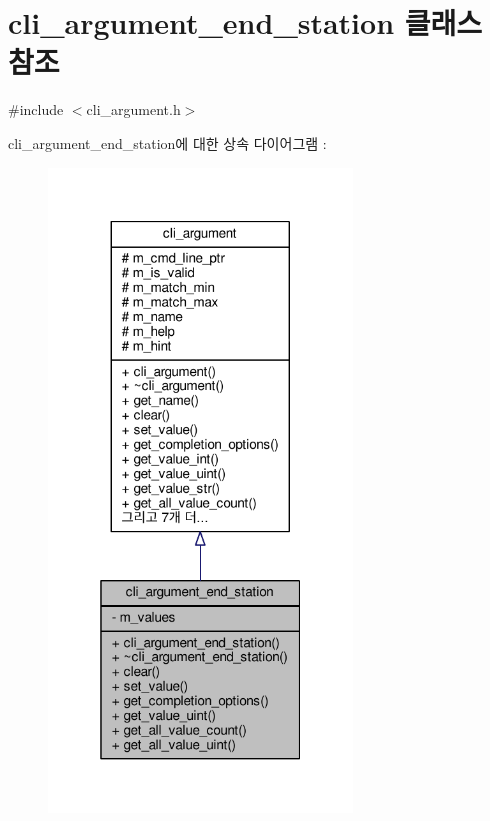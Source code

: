 \hypertarget{classcli__argument__end__station}{}\section{cli\+\_\+argument\+\_\+end\+\_\+station 클래스 참조}
\label{classcli__argument__end__station}


{\ttfamily \#include $<$cli\+\_\+argument.\+h$>$}



cli\+\_\+argument\+\_\+end\+\_\+station에 대한 상속 다이어그램 \+: 
\nopagebreak
\begin{figure}[H]
\begin{center}
\leavevmode
\includegraphics[width=229pt]{classcli__argument__end__station__inherit__graph}
\end{center}
\end{figure}


